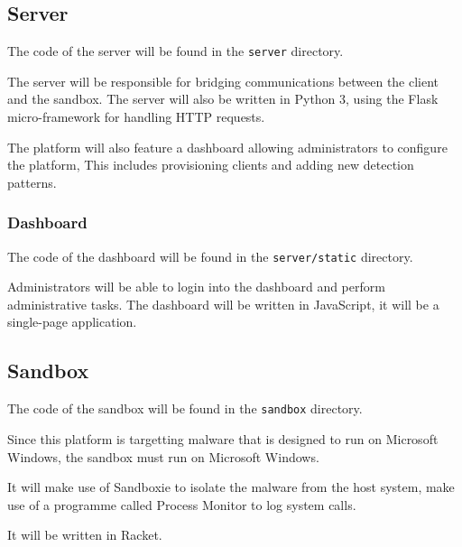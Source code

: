 \subsection{Server}
The code of the server will be found in the \texttt{server} directory.

The server will be responsible for bridging communications between the client and the sandbox.
The server will also be written in Python 3, using the Flask micro-framework for handling HTTP requests.

The platform will also feature a dashboard allowing administrators to configure the platform,
This includes provisioning clients and adding new detection patterns.

\subsubsection{Dashboard}

The code of the dashboard will be found in the \texttt{server/static} directory.

Administrators will be able to login into the dashboard and perform administrative tasks.
The dashboard will be written in JavaScript, it will be a single-page application.



\subsection{Sandbox}
The code of the sandbox will be found in the \texttt{sandbox} directory.

Since this platform is targetting malware that is designed to run on Microsoft Windows,
the sandbox must run on Microsoft Windows.

It will make use of Sandboxie to isolate the malware from the host system,
make use of a programme called Process Monitor to log system calls.

It will be written in Racket.






